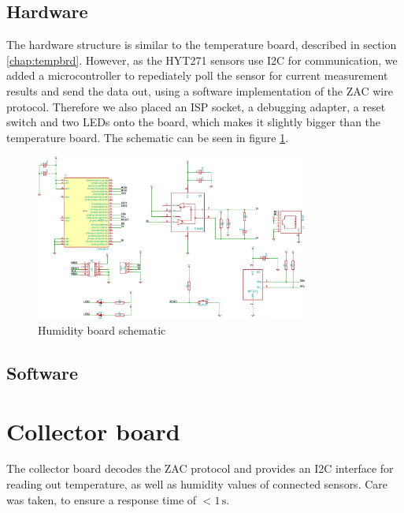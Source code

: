 \documentclass[a4paper]{scrreprt}
\begin{document}
\subsection{Hardware}
The hardware structure is similar to the temperature board, described in section \ref{chap:tempbrd}. However, as the HYT271 sensors use I2C for
communication, we added a microcontroller to repediately poll the sensor for current measurement results and send the data out, using a software
implementation of the ZAC wire protocol. Therefore we also placed an ISP socket, a debugging adapter, a reset switch and two LEDs onto the board, which makes it
slightly bigger than the temperature board. The schematic can be seen in figure \ref{fig:schem_hum}.
\begin{figure}
	\centering
	\includegraphics[width=0.8\textwidth]{img/schem_humidity_board.pdf}
	\caption{Humidity board schematic}
	\label{fig:schem_hum}
\end{figure}
\subsection{Software}
\section{Collector board}
The collector board decodes the ZAC protocol and provides an I2C interface for
reading out temperature, as well as humidity values of connected sensors.
Care was taken, to ensure a response time of $<1\,\mathrm{s}$.
\end{document}
